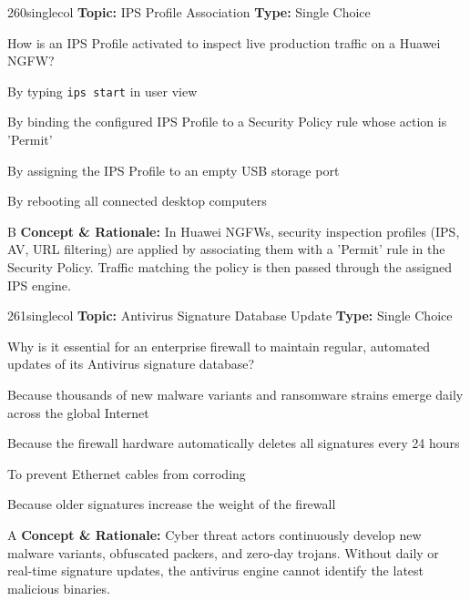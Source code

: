 \begin{qcard}{260}{singlecol}
\textcolor{darkslate!75}{\small\textbf{Topic:} IPS Profile Association \hfill \textbf{Type:} Single Choice}\vspace{0.4em}\par
How is an IPS Profile activated to inspect live production traffic on a Huawei NGFW?
\begin{qoptions}
\item By typing \texttt{ips start} in user view
\item By binding the configured IPS Profile to a Security Policy rule whose action is 'Permit'
\item By assigning the IPS Profile to an empty USB storage port
\item By rebooting all connected desktop computers
\end{qoptions}
\end{qcard}
\nopagebreak
\begin{explainbox}{B}
\textbf{Concept \& Rationale:} In Huawei NGFWs, security inspection profiles (IPS, AV, URL filtering) are applied by associating them with a 'Permit' rule in the Security Policy. Traffic matching the policy is then passed through the assigned IPS engine.
\end{explainbox}

\begin{qcard}{261}{singlecol}
\textcolor{darkslate!75}{\small\textbf{Topic:} Antivirus Signature Database Update \hfill \textbf{Type:} Single Choice}\vspace{0.4em}\par
Why is it essential for an enterprise firewall to maintain regular, automated updates of its Antivirus signature database?
\begin{qoptions}
\item Because thousands of new malware variants and ransomware strains emerge daily across the global Internet
\item Because the firewall hardware automatically deletes all signatures every 24 hours
\item To prevent Ethernet cables from corroding
\item Because older signatures increase the weight of the firewall
\end{qoptions}
\end{qcard}
\nopagebreak
\begin{explainbox}{A}
\textbf{Concept \& Rationale:} Cyber threat actors continuously develop new malware variants, obfuscated packers, and zero-day trojans. Without daily or real-time signature updates, the antivirus engine cannot identify the latest malicious binaries.
\end{explainbox}

